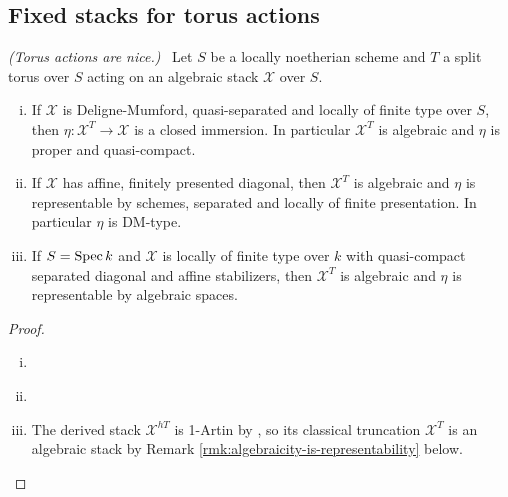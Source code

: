 \documentclass[12pt,dvipsnames]{amsart}
\begin{document}
\subsection{Fixed stacks for torus actions}\label{rl-000C}
\begin{lemma}\label{rl-000D}
  \label{lem:torus-actions-are-nice}
  \textit{(Torus actions are nice.)}~
  Let \(S\) be a locally noetherian scheme and \(T\) a split torus over \(S\) acting on an algebraic stack \(\mathcal X\) over \(S\).
  \begin{enumerate}[(i)]
    \item If \(\mathcal X\) is Deligne-Mumford, quasi-separated and locally of finite type over \(S\), then \(\eta:\mathcal X^T\to \mathcal X\) is a closed immersion. In particular \(\mathcal X^T\) is algebraic and \(\eta\) is proper and quasi-compact.
    \item If \(\mathcal X\) has affine, finitely presented diagonal, then \(\mathcal X^T\) is algebraic and \(\eta\) is representable by schemes, separated and locally of finite presentation. In particular \(\eta\) is DM-type.
    \item If \(S = \operatorname{Spec} k\) and \(\mathcal X\) is locally of finite type over \(k\) with quasi-compact separated diagonal and affine stabilizers, then \(\mathcal X^T\) is algebraic \cite[Thm. A.20, Rmk A.19]{aranha-khan-latyntsev-etal_VirtualLocalizationRevisited2025} and \(\eta\) is representable by algebraic spaces.
  \end{enumerate}
\end{lemma}
\begin{proof}
$ $
  \begin{enumerate}[(i)]
    \item \cite[Prop A.23]{aranha-khan-latyntsev-etal_VirtualLocalizationRevisited2025}
    \item \cite[Thm 1.2.1 (1)]{romagny_AlgebraicitySmoothnessFixed2022}
          \item The derived stack \(\mathcal X^{hT}\) is 1-Artin by \cite[Thm. A.20]{aranha-khan-latyntsev-etal_VirtualLocalizationRevisited2025}, so its classical truncation \(\mathcal X^T\) is an algebraic stack by Remark \ref{rmk:algebraicity-is-representability} below.
  \end{enumerate}
\end{proof}
\end{document}
